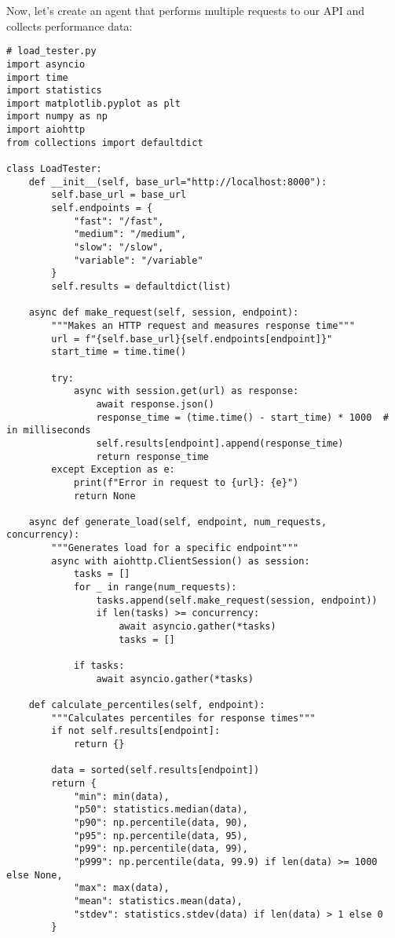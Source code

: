 \documentclass[12pt,letterpaper]{article}
\newenvironment{macterminal}{%
    \begin{mdframed}[
        linecolor=terminalFrame,
        backgroundcolor=terminalBg,
        roundcorner=5pt,
        skipabove=10pt,
        skipbelow=10pt,
        linewidth=1pt,
        innertopmargin=10pt, %
        frametitle={%
            \tikz[baseline=(current bounding box.east), outer sep=0pt]{
                \fill[red!80!black] (0,0) circle (5pt);
                \fill[yellow!80!black] (0.7,0) circle (5pt);
                \fill[green!70!black] (1.4,0) circle (5pt);
            }
        },
        frametitlealignment=\raggedright, %
        frametitleaboveskip=8pt, %
        frametitlebelowskip=0pt, %
    ]
}{%
    \end{mdframed}%
}
\begin{document}
Now, let's create an agent that performs multiple requests to our API and collects performance data:

\begin{macterminal}
\begin{lstlisting}
# load_tester.py
import asyncio
import time
import statistics
import matplotlib.pyplot as plt
import numpy as np
import aiohttp
from collections import defaultdict

class LoadTester:
    def __init__(self, base_url="http://localhost:8000"):
        self.base_url = base_url
        self.endpoints = {
            "fast": "/fast",
            "medium": "/medium",
            "slow": "/slow",
            "variable": "/variable"
        }
        self.results = defaultdict(list)
    
    async def make_request(self, session, endpoint):
        """Makes an HTTP request and measures response time"""
        url = f"{self.base_url}{self.endpoints[endpoint]}"
        start_time = time.time()
        
        try:
            async with session.get(url) as response:
                await response.json()
                response_time = (time.time() - start_time) * 1000  # in milliseconds
                self.results[endpoint].append(response_time)
                return response_time
        except Exception as e:
            print(f"Error in request to {url}: {e}")
            return None
    
    async def generate_load(self, endpoint, num_requests, concurrency):
        """Generates load for a specific endpoint"""
        async with aiohttp.ClientSession() as session:
            tasks = []
            for _ in range(num_requests):
                tasks.append(self.make_request(session, endpoint))
                if len(tasks) >= concurrency:
                    await asyncio.gather(*tasks)
                    tasks = []
            
            if tasks:
                await asyncio.gather(*tasks)
    
    def calculate_percentiles(self, endpoint):
        """Calculates percentiles for response times"""
        if not self.results[endpoint]:
            return {}
        
        data = sorted(self.results[endpoint])
        return {
            "min": min(data),
            "p50": statistics.median(data),
            "p90": np.percentile(data, 90),
            "p95": np.percentile(data, 95),
            "p99": np.percentile(data, 99),
            "p999": np.percentile(data, 99.9) if len(data) >= 1000 else None,
            "max": max(data),
            "mean": statistics.mean(data),
            "stdev": statistics.stdev(data) if len(data) > 1 else 0
        }
    

\end{lstlisting}
\end{macterminal}
\end{document}
